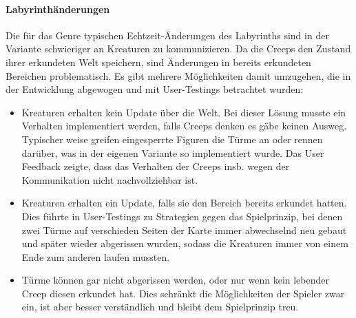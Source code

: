 \paragraph{Labyrinthänderungen} Die für das Genre typischen Echtzeit-Änderungen des Labyrinths sind in der Variante schwieriger an Kreaturen zu kommunizieren. Da die Creeps den Zustand ihrer erkundeten Welt speichern, sind Änderungen in bereits erkundeten Bereichen problematisch. Es gibt mehrere Möglichkeiten damit umzugehen, die in der Entwicklung abgewogen und mit User-Testings betrachtet wurden:
\begin{itemize}
	\item Kreaturen erhalten kein Update über die Welt. Bei dieser Lösung musste ein Verhalten implementiert werden, falls Creeps denken es gäbe keinen Ausweg. Typischer weise greifen eingesperrte Figuren die Türme an oder rennen darüber, was in der eigenen Variante so implementiert wurde. Das User Feedback zeigte, dass das Verhalten der Creeps insb. wegen der Kommunikation nicht nachvollziehbar ist.
	\item Kreaturen erhalten ein Update, falls sie den Bereich bereits erkundet hatten. Dies führte in User-Testings zu Strategien gegen das Spielprinzip, bei denen zwei Türme auf verschieden Seiten der Karte immer abwechselnd neu gebaut und später wieder abgerissen wurden, sodass die Kreaturen immer von einem Ende zum anderen laufen mussten.
	\item Türme können gar nicht abgerissen werden, oder nur wenn kein lebender Creep diesen erkundet hat. Dies schränkt die Möglichkeiten der Spieler zwar ein, ist aber besser verständlich und bleibt dem Spielprinzip treu.
\end{itemize}

